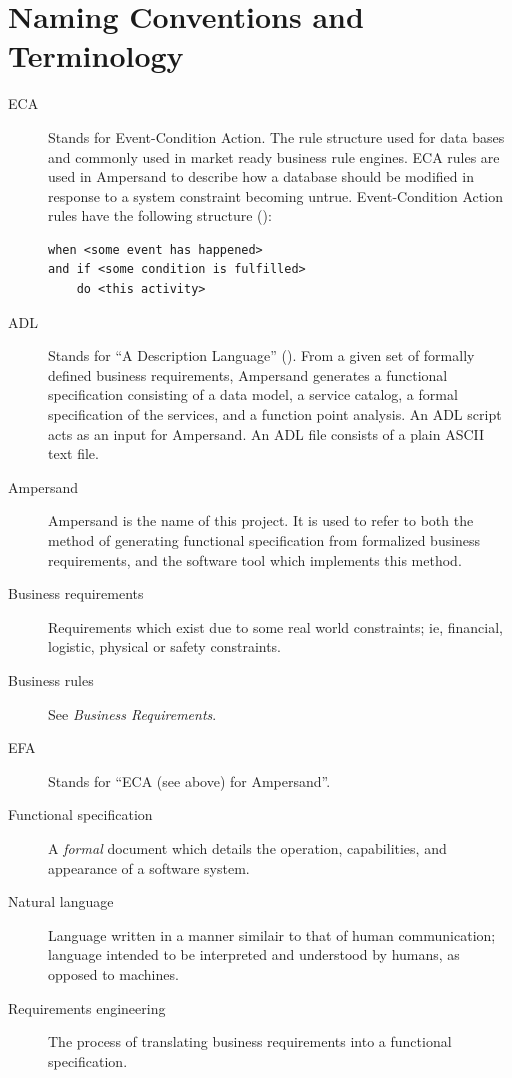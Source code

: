 \documentclass[12pt]{report}
\begin{document}
\section{Naming Conventions and Terminology}\label{sec:Naming} 
\begin{description}
\item[ECA] Stands for Event-Condition Action. The rule structure used for data
  bases and commonly used in market ready business rule engines. ECA rules are
  used in Ampersand to describe how a database should be modified in response to
  a system constraint becoming untrue. Event-Condition Action rules have
  the following structure (\cite[8--9]{RBD}):
\begin{verbatim}
when <some event has happened> 
and if <some condition is fulfilled> 
    do <this activity>
\end{verbatim} %
\item [ADL] Stands for ``A Description Language'' (\cite[13]{derFun}). From a
given set of formally defined business requirements, Ampersand generates a
functional specification consisting of a data model, a service catalog, a
formal specification of the services, and a function point analysis. An ADL
script acts as an input for Ampersand. An ADL file consists of a plain ASCII
text file.
\item [Ampersand] Ampersand is the name of this project. It is used to refer to
both the method of generating functional specification from formalized
business requirements, and the software tool which implements this method.
\item [Business requirements] Requirements which exist due to some real world constraints;
ie, financial, logistic, physical or safety constraints. 
\item [Business rules] See \emph{Business Requirements}.\item [EFA] Stands for ``ECA (see above) 
for Ampersand''.
\item [Functional specification] A \emph{formal} document which details the operation,
  capabilities, and appearance of a software system. 

\item [Natural language] Language written in a manner similair to that of human communication; 
  language intended to be interpreted and understood by humans, as opposed to machines. 
\item [Requirements engineering] The process of translating business
requirements into a functional specification. 
 


\end{description}
\end{document}
